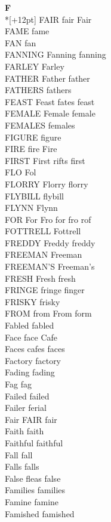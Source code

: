\vspace{14pt}
\noindent\textbf{\Large F}\\*[+12pt]
FAIR fair Fair\\
FAME fame\\
FAN fan\\
FANNING Fanning fanning\\
FARLEY Farley\\
FATHER Father father\\
FATHERS fathers\\
FEAST Feast fates feast\\
FEMALE Female female\\
FEMALES females\\
FIGURE figure\\
FIRE fire Fire\\
FIRST First rifts first\\
FLO Fol\\
FLORRY Florry florry\\
FLYBILL flybill\\
FLYNN Flynn\\
FOR For Fro for fro rof\\
FOTTRELL Fottrell\\
FREDDY Freddy freddy\\
FREEMAN Freeman\\
FREEMAN'S Freeman's\\
FRESH Fresh fresh\\
FRINGE fringe finger\\
FRISKY frisky\\
FROM from From form\\
Fabled fabled\\
Face face Cafe\\
Faces cafes faces\\
Factory factory\\
Fading fading\\
Fag fag\\
Failed failed\\
Failer ferial\\
Fair FAIR fair\\
Faith faith\\
Faithful faithful\\
Fall fall\\
Falls falls\\
False fleas false\\
Families families\\
Famine famine\\
Famished famished\\

